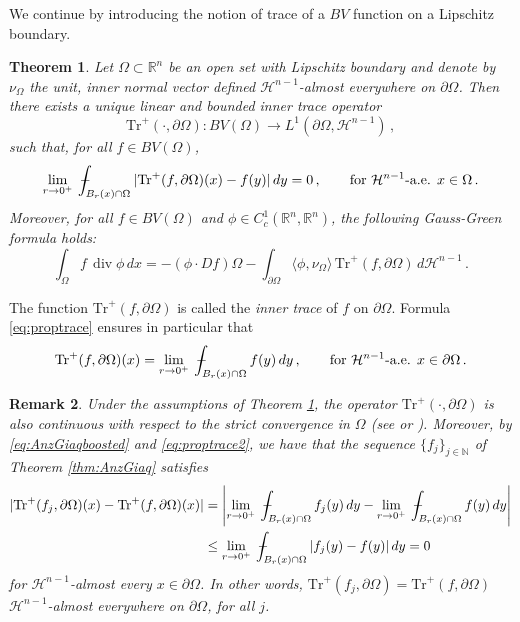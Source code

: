 \documentclass[a4paper,reqno,11pt]{amsart}
\newtheorem{theorem}{Theorem}[section]
\newtheorem{remark}[theorem]{Remark}
\newcommand{\N}{\mathbb{N}}
\newcommand{\R}{\mathbb{R}}
\newcommand{\ra}{\rightarrow}
\newcommand{\Hau}{{\mathcal H}} %
\newcommand{\mint}[1]{\,-\hskip-1.08em\int_{#1}} %
\newcommand{\de}{\partial}
\renewcommand{\div}{\mathop{\mathrm{div}}}
\newcommand{\Tr}{{\mathrm{Tr}}}
\begin{document}
We continue by introducing the notion of trace of a $BV$ function on a Lipschitz boundary.
	\begin{theorem} \label{thm:trace}
		Let $\Omega \subset \R^{n}$ be an open set with Lipschitz boundary and denote by $\nu_{\Omega}$ the unit, inner normal vector defined $\Hau^{n-1}$-almost everywhere on $\de \Omega$. Then there exists a unique linear and bounded \emph{inner trace operator}
\begin{equation*}
	\Tr^{+}(\cdot,\de \Omega): BV(\Omega) \rightarrow L^{1}(\de \Omega, \Hau^{n-1})\,,
\end{equation*}
such that, for all $f \in BV(\Omega)$,
\begin{equation} \label{eq:proptrace}
	\lim_{r \ra 0^+} \, \mint{B_{r}(x) \cap \Omega} |\Tr^{+}(f,\de \Omega)(x) - f(y)| \, dy = 0 \, , \qquad \text{for $\Hau^{n-1}$-a.e. $x \in \Omega \, .$}
\end{equation}
Moreover, for all $f \in BV(\Omega)$ and $\phi \in C^{1}_{c}(\R^{n}, \R^{n})$, the following Gauss-Green formula holds:
\begin{equation*} %
	\int_{\Omega} f \, \div \phi \, dx = -(\phi \cdot Df) \Omega - \int_{\de \Omega} \langle \phi, \nu_{\Omega} \rangle \, \Tr^{+}(f,\de \Omega) \, d \Hau^{n-1}\, .
\end{equation*}
\end{theorem}
The function $\Tr^{+}(f,\de \Omega)$ is called the \emph{inner trace} of $f$ on $\de\Omega$. Formula \eqref{eq:proptrace} ensures in particular that
\begin{equation} \label{eq:proptrace2}
		\Tr^{+}(f,\de \Omega)(x) = \lim_{r \ra 0^+} \, \mint{B_{r}(x) \cap \Omega} f(y) \, dy \, , \qquad \text{for $\Hau^{n-1}$-a.e. $x \in \de \Omega \, .$}
\end{equation}
\begin{remark} \label{rem:contrace}
	Under the assumptions of Theorem \ref{thm:trace}, the operator $\Tr^{+}(\cdot,\de \Omega)$ is also continuous with respect to the strict convergence in $\Omega$ (see \cite[Theorem 2.11]{Giu84book} or \cite[Theorem 3.88]{AmbrosioFuscoPallara2000}). Moreover, by \eqref{eq:AnzGiaqboosted} and \eqref{eq:proptrace2}, we have that the sequence $\{f_{j}\}_{j\in \N}$ of Theorem \ref{thm:AnzGiaq} satisfies
\begin{align} \label{eq:traceappr}
			|\Tr^{+}(f_{j},\de \Omega)(x) - \Tr^{+}(f,\de \Omega)(x)| & = \left| \lim_{r \ra 0^+} \, \mint{B_{r}(x) \cap \Omega} f_{j}(y) \, dy - \lim_{r \ra 0^+} \, \mint{B_{r}(x) \cap \Omega} f(y) \, dy \right| \nonumber \\
			& \leq \lim_{r \ra 0^+} \, \mint{B_{r}(x) \cap \Omega} |f_{j}(y) - f(y)| \, dy = 0\nonumber
\end{align}
 for $\Hau^{n-1}$-almost every $x \in \de \Omega$. In other words, $\Tr^{+}(f_{j},\de \Omega) = \Tr^{+}(f,\de \Omega)$ $\Hau^{n-1}$-almost everywhere on $\de\Omega$, for all $j$.
	\end{remark}
	
\end{document}
